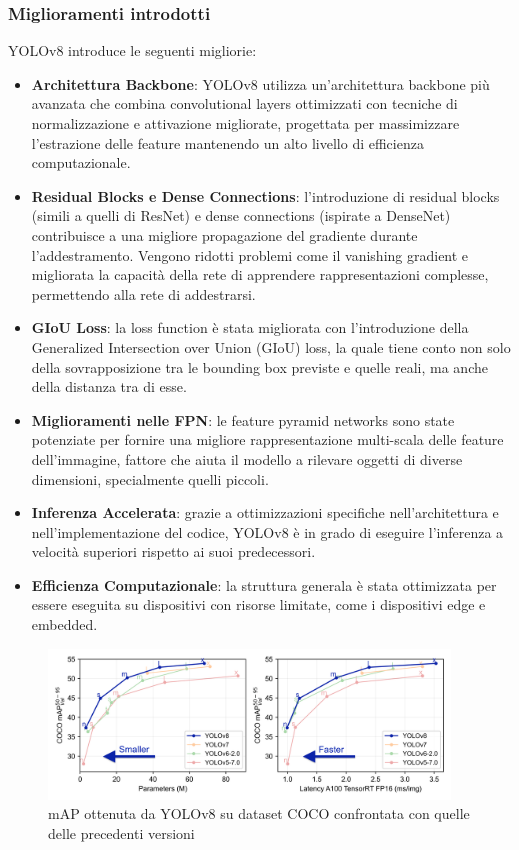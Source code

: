 \subsubsection{Miglioramenti introdotti}
YOLOv8 introduce le seguenti migliorie: 
\begin{itemize}
  \item \textbf{Architettura Backbone}: YOLOv8 utilizza un'architettura backbone più avanzata che combina convolutional layers ottimizzati con tecniche di normalizzazione e attivazione migliorate, progettata per massimizzare l'estrazione delle feature mantenendo un alto livello di efficienza computazionale.
  \item \textbf{Residual Blocks e Dense Connections}: l'introduzione di residual blocks (simili a quelli di ResNet) e dense connections (ispirate a DenseNet) contribuisce a una migliore propagazione del gradiente durante l'addestramento. Vengono ridotti problemi come il vanishing gradient e migliorata la capacità della rete di apprendere rappresentazioni complesse, permettendo alla rete di addestrarsi.
  \item \textbf{GIoU Loss}: la loss function è stata migliorata con l'introduzione della Generalized Intersection over Union (GIoU) loss, la quale tiene conto non solo della sovrapposizione tra le bounding box previste e quelle reali, ma anche della distanza tra di esse.
  \item \textbf{Miglioramenti nelle FPN}: le feature pyramid networks sono state potenziate per fornire una migliore rappresentazione multi-scala delle feature dell'immagine, fattore che aiuta il modello a rilevare oggetti di diverse dimensioni, specialmente quelli piccoli.
  \item \textbf{Inferenza Accelerata}: grazie a ottimizzazioni specifiche nell'architettura e nell'implementazione del codice, YOLOv8 è in grado di eseguire l'inferenza a velocità superiori rispetto ai suoi predecessori.
  \item \textbf{Efficienza Computazionale}: la struttura generala è stata ottimizzata per essere eseguita su dispositivi con risorse limitate, come i dispositivi edge e embedded. 
\end{itemize}

\begin{figure}[ht]
    \centering
    \includegraphics[width=0.95\textwidth]{files/capitoli/2-yolo/assets/yolov8-benchmark.png}
    \caption{\label{fig:yolov8-benchmark}mAP ottenuta da YOLOv8 su dataset COCO confrontata con quelle delle precedenti versioni\cite{27}}
\end{figure}

